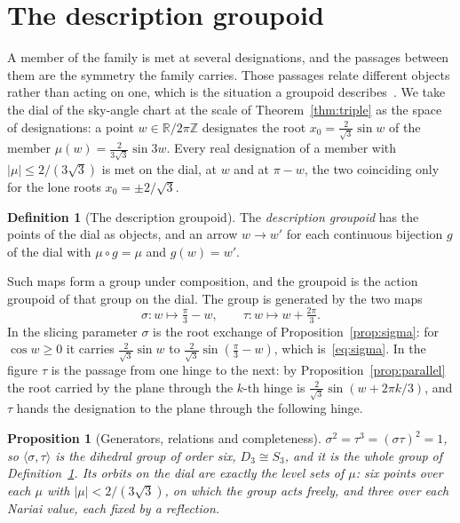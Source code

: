 \documentclass[11pt]{article}
\theoremstyle{plain}
\newtheorem{proposition}[theorem]{Proposition}
\theoremstyle{definition}
\newtheorem{definition}[theorem]{Definition}
\theoremstyle{remark}
\begin{document}
\section{The description groupoid}\label{sec:groupoid}

A member of the family is met at several designations, and the passages between them are the symmetry the
family carries. Those passages relate different objects rather than acting on one, which is the situation a
groupoid describes~\cite{Weinstein1996}. We take the dial of the sky-angle chart at the scale of
Theorem~\ref{thm:triple} as the space of designations: a point $w\in\mathbb{R}/2\pi\mathbb{Z}$ designates the root
$x_{0}=\tfrac{2}{\sqrt3}\sin w$ of the member $\mu(w)=\tfrac{2}{3\sqrt3}\sin3w$. Every real designation of a member with
$|\mu|\le2/(3\sqrt3)$ is met on the dial, at $w$ and at $\pi-w$, the two coinciding only for the lone roots
$x_{0}=\pm2/\sqrt3$.

\begin{definition}[The description groupoid]\label{def:groupoid}
The \emph{description groupoid} has the points of the dial as objects, and an arrow $w\to w'$ for each continuous
bijection $g$ of the dial with $\mu\circ g=\mu$ and $g(w)=w'$.
\end{definition}

Such maps form a group under composition, and the groupoid is the action groupoid of that group on the dial.
The group is generated by the two maps
\begin{equation}\label{eq:generators}
\sigma:w\mapsto\tfrac{\pi}{3}-w,\qquad \tau:w\mapsto w+\tfrac{2\pi}{3}.
\end{equation}
In the slicing parameter $\sigma$ is the root exchange of Proposition~\ref{prop:sigma}: for $\cos w\ge0$ it carries
$\tfrac{2}{\sqrt3}\sin w$ to $\tfrac{2}{\sqrt3}\sin(\tfrac{\pi}{3}-w)$, which is~\eqref{eq:sigma}. In the figure $\tau$ is
the passage from one hinge to the next: by Proposition~\ref{prop:parallel} the root carried by the plane through
the $k$-th hinge is $\tfrac{2}{\sqrt3}\sin(w+2\pi k/3)$, and $\tau$ hands the designation to the plane through the
following hinge.

\begin{proposition}[Generators, relations and completeness]\label{prop:D3}
$\sigma^{2}=\tau^{3}=(\sigma\tau)^{2}=1$, so $\langle\sigma,\tau\rangle$ is the dihedral group of order six, $D_{3}\cong S_{3}$,
and it is the whole group of Definition~\ref{def:groupoid}. Its orbits on the dial are exactly the level sets of
$\mu$: six points over each $\mu$ with $|\mu|<2/(3\sqrt3)$, on which the group acts freely, and three over each
Nariai value, each fixed by a reflection.
\end{proposition}
\end{document}
